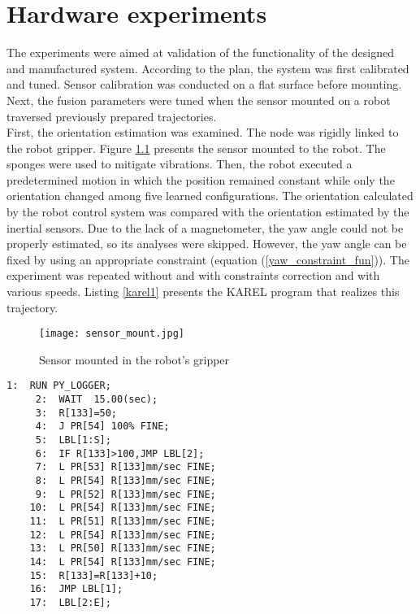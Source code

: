 \chapter{Hardware experiments}

The experiments were aimed at validation of the functionality of the designed and manufactured system. According to the plan, the system was first calibrated and tuned. Sensor calibration was conducted on a flat surface before mounting. Next, the fusion parameters were tuned when the sensor mounted on a robot traversed previously prepared trajectories.\\

First, the orientation estimation was examined. The node was rigidly linked to the robot gripper. Figure \ref{sensor_mount} presents the sensor mounted to the robot. The sponges were used to mitigate vibrations. Then, the robot executed a predetermined motion in which the position remained constant while only the orientation changed among five learned configurations. The orientation calculated by the robot control system was compared with the orientation estimated by the inertial sensors. Due to the lack of a magnetometer, the yaw angle could not be properly estimated, so its analyses were skipped. However, the yaw angle can be fixed by using an appropriate constraint (equation (\ref{yaw_constraint_fun})). The experiment was repeated without and with constraints correction and with various speeds. Listing \ref{karel1} presents the KAREL program that realizes this trajectory.
 
 \begin{figure}[!h]
 	\centering
 	\texttt{[image: sensor\_mount.jpg]}
 	\caption{Sensor mounted in the robot's gripper}
 	\label{sensor_mount}
 \end{figure}
 
 \begin{lstlisting}[caption={The KAREL program realizing an orientation changes}, captionpos=t, label=karel1]
	 1:  RUN PY_LOGGER;
	 2:  WAIT  15.00(sec);
	 3:  R[133]=50;
	 4:  J PR[54] 100% FINE;
	 5:  LBL[1:S];
	 6:  IF R[133]>100,JMP LBL[2];
	 7:  L PR[53] R[133]mm/sec FINE;
	 8:  L PR[54] R[133]mm/sec FINE;
	 9:  L PR[52] R[133]mm/sec FINE;
	10:  L PR[54] R[133]mm/sec FINE;
	11:  L PR[51] R[133]mm/sec FINE;
	12:  L PR[54] R[133]mm/sec FINE;
	13:  L PR[50] R[133]mm/sec FINE;
	14:  L PR[54] R[133]mm/sec FINE;
	15:  R[133]=R[133]+10;
	16:  JMP LBL[1];
	17:  LBL[2:E];
 \end{lstlisting}


